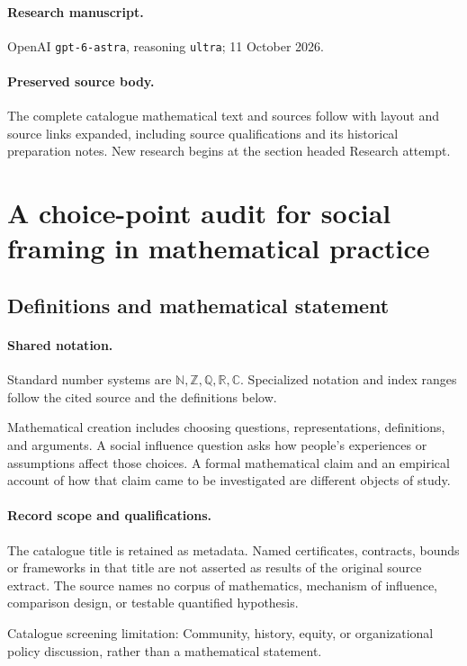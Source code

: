 \documentclass[11pt]{article}
\begin{document}
\paragraph{Research manuscript.} OpenAI \texttt{gpt-6-astra}, reasoning \texttt{ultra}; 11 October 2026.
\paragraph{Preserved source body.} The complete catalogue mathematical text and sources follow with layout and source links expanded, including source qualifications and its historical preparation notes. New research begins at the section headed Research attempt.

\section{A choice-point audit for social framing in mathematical practice}\label{statement}

\subsection{Definitions and mathematical statement}

\paragraph{Shared notation.}Standard number systems are $\mathbb N,\mathbb Z,\mathbb Q,\mathbb R,\mathbb C$. Specialized notation and index ranges follow the cited source and the definitions below.


Mathematical creation includes choosing questions, representations, definitions, and arguments. A social influence question asks how people's experiences or assumptions affect those choices. A formal mathematical claim and an empirical account of how that claim came to be investigated are different objects of study.
\paragraph{Record scope and qualifications.}
The catalogue title is retained as metadata. Named certificates, contracts, bounds or frameworks in that title are not asserted as results of the original source extract.
The source names no corpus of mathematics, mechanism of influence, comparison design, or testable quantified hypothesis.

Catalogue screening limitation: Community, history, equity, or organizational policy discussion, rather than a mathematical statement.
\end{document}
